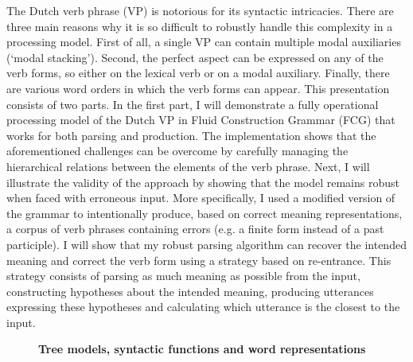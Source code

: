 \documentclass[10pt, a4paper, twopage, headinclude, footinclude, BCOR5mm]{scrartcl}
\begin{document}
{{\begin{table}[t!]
{\begin{tabular}{c}
    \end{tabular} }
    \end{table}

\noindent
The Dutch verb phrase (VP) is notorious for its syntactic intricacies. There are three main reasons why it is so difficult to robustly handle this complexity in a processing model. First of all, a single VP can contain multiple modal auxiliaries (‘modal stacking’). Second, the perfect aspect can be expressed on any of the verb forms, so either on the lexical verb or on a modal auxiliary. Finally, there are various word orders in which the verb forms can appear.   This presentation consists of two parts. In the first part, I will demonstrate a fully operational processing model of the Dutch VP in Fluid Construction Grammar (FCG) that works for both parsing and production. The implementation shows that the aforementioned challenges can be overcome by carefully managing the hierarchical relations between the elements of the verb phrase. Next, I will illustrate the validity of the approach by showing that the model remains robust when faced with erroneous input. More specifically, I used a modified version of the grammar to intentionally produce, based on correct meaning representations, a corpus of verb phrases containing errors (e.g. a finite form instead of a past participle). I will show that my robust parsing algorithm can recover the intended meaning and correct the verb form using a strategy based on re-entrance. This strategy consists of parsing as much meaning as possible from the input, constructing hypotheses about the intended meaning, producing utterances expressing these hypotheses and calculating which utterance is the closest to the input. 


\newpage

\begin{figure}[t!]
\centering
\large\textbf{Tree models, syntactic functions and word representations}
\vspace*{0.5cm}
\end{figure}


        \begin{table}[t!]
\end{table}}}
\end{document}

